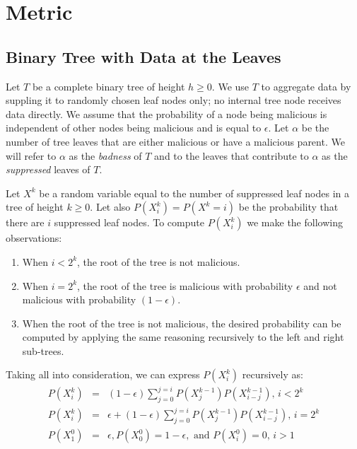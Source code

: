 \documentclass[11pt,twocolumn]{MyTightStyle}
\theoremstyle{plain}
\theoremstyle{definition}
\theoremstyle{remark}
\numberwithin{equation}{section}
\begin{document}
  \section{Metric}

  \subsection{Binary Tree with Data at the Leaves}
  \label{sec:leaves}
  
  Let $T$ be a complete binary tree of height $h \geq 0$. We use $T$
  to aggregate data by suppling it to randomly chosen leaf nodes
  only; no internal tree node receives data directly. We assume that
  the probability of a node being malicious is independent of other
  nodes being malicious and is equal to $\epsilon$. Let $\alpha$ be
  the number of tree leaves that are either malicious or have a
  malicious parent. We will refer to $\alpha$ as the \emph{badness} of $T$
  and to the leaves that contribute to $\alpha$ as the
  \emph{suppressed} leaves of $T$.

  Let $X^k$ be a random variable equal to the number of suppressed leaf
  nodes in a tree of height $k \geq 0$. Let also $P(X^k_i)=P(X^k=i)$
  be the probability that there are $i$ suppressed leaf nodes. To
  compute $P(X^k_i)$ we make the following observations:
  \begin{enumerate}
    \item When {\bf $i<2^k$}, the root of the tree is not malicious.
    \item When {\bf $i=2^k$}, the root of the tree is malicious with
  probability $\epsilon$ and not malicious with probability
  $(1-\epsilon)$.
    \item When the root of the tree is not malicious, the desired
    probability can be computed by applying the same reasoning
    recursively to the left and right sub-trees.
  \end{enumerate}
  Taking all into consideration, we can express $P(X^k_i)$
  recursively as:
  \begin{eqnarray}\label{eqn:notmalicious}
    P(X^k_i) &=& (1-\epsilon)\sum_{j=0}^{j=i}P(X^{k-1}_j)P(X^{k-1}_{i-j})
    \textrm{, $i<2^k$}\\
    P(X^k_i) &=& \epsilon + (1-\epsilon)\sum_{j=0}^{j=i}P(X^{k-1}_j)P(X^{k-1}_{i-j})
    \textrm{, $i=2^k$}\\
     P(X^0_1)&=&\epsilon,P(X^0_0)=1-\epsilon, \textrm{ and }P(X^0_i)=0
    \textrm{, $i>1$}
  \end{eqnarray}
\end{document}
